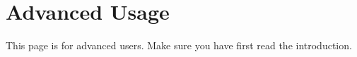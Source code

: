 \chapter{Advanced Usage}
\hypertarget{advanced}{}\label{advanced}
This page is for advanced users. Make sure you have first read the introduction. 